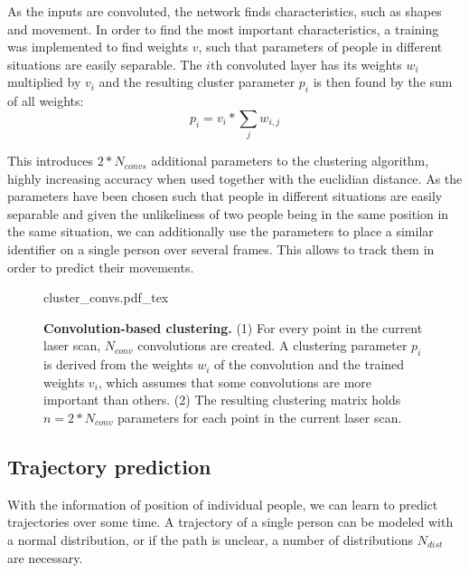 As the inputs are convoluted, the network finds characteristics, such as shapes and movement. In order to find the most important characteristics, a training was implemented to find weights $v$, such that parameters of people in different situations are easily separable. The $i$th convoluted layer has its weights $w_i$ multiplied by $v_i$ and the resulting cluster parameter $p_i$ is then found by the sum of all weights:
\begin{equation}
	p_i = v_{i} * \sum_{j} w_{i,j}
\end{equation}

This introduces $2*N_{convs}$ additional parameters to the clustering algorithm, highly increasing accuracy when used together with the euclidian distance. As the parameters have been chosen such that people in different situations are easily separable and given the unlikeliness of two people being in the same position in the same situation, we can additionally use the parameters to place a similar identifier on a single person over several frames. This allows to track them in order to predict their movements.

\begin{figure}
\def\svgwidth{0.4 \textwidth}
\small
{cluster_convs.pdf_tex}
\caption{\textbf{Convolution-based clustering.} (1) For every point in the current laser scan, $N_{conv}$ convolutions are created. A clustering parameter $p_i$ is derived from the weights $w_i$ of the convolution and the trained weights $v_i$, which assumes that some convolutions are more important than others. (2) The resulting clustering matrix holds $n=2*N_{conv}$ parameters for each point in the current laser scan.}
\label{fig:cluster_convs}
\end{figure}




\subsection{Trajectory prediction}

With the information of position of individual people, we can learn to predict trajectories over some time. A trajectory of a single person can be modeled with a normal distribution, or if the path is unclear, a number of distributions $N_{dist}$ are necessary.

